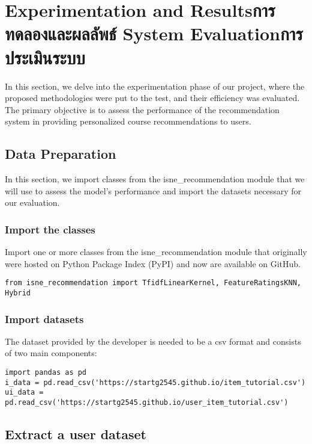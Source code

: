 \chapter{\ifproject%
\ifenglish Experimentation and Results\else การทดลองและผลลัพธ์\fi
\else%
\ifenglish System Evaluation\else การประเมินระบบ\fi
\fi}

In this section, we delve into the experimentation phase of our project, where 
the proposed methodologies were put to the test, and their efficiency was 
evaluated. The primary objective is to assess the performance of the 
recommendation system in providing personalized course recommendations to users.

\section{Data Preparation}

In this section, we import classes from the isne\_recommendation module 
that we will use to assess the model's performance and import the datasets 
necessary for our evaluation.

\subsection{Import the classes}

Import one or more classes from the isne\_recommendation module that originally 
were hosted on Python Package Index (PyPI) and now are available on GitHub. 

\begin{verbatim}
from isne_recommendation import TfidfLinearKernel, FeatureRatingsKNN, Hybrid
\end{verbatim}

\subsection{Import datasets}

The dataset provided by the developer is needed to be a csv format and consists of two main components:

\begin{verbatim}
import pandas as pd
i_data = pd.read_csv('https://startg2545.github.io/item_tutorial.csv')
ui_data = pd.read_csv('https://startg2545.github.io/user_item_tutorial.csv')
\end{verbatim}

\section{Extract a user dataset}

